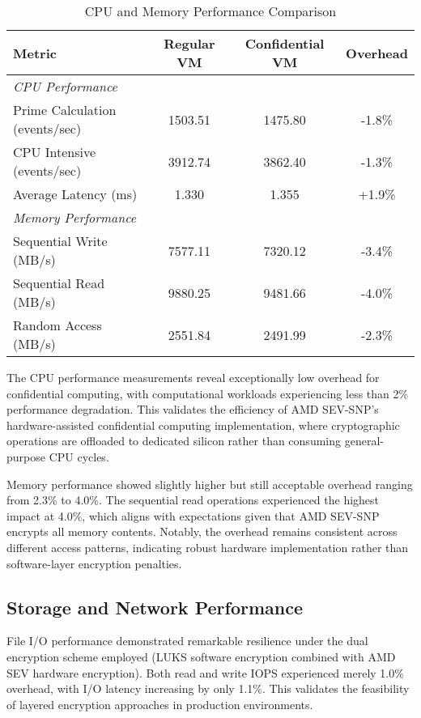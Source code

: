 \begin{table}[htbp]
\centering
\caption{CPU and Memory Performance Comparison}
\label{tab:cpu_memory_performance}
\begin{tabular}{lccc}
\toprule
\textbf{Metric} & \textbf{Regular VM} & \textbf{Confidential VM} & \textbf{Overhead} \\
\midrule
\multicolumn{4}{l}{\textit{CPU Performance}} \\
Prime Calculation (events/sec) & 1503.51 & 1475.80 & -1.8\% \\
CPU Intensive (events/sec) & 3912.74 & 3862.40 & -1.3\% \\
Average Latency (ms) & 1.330 & 1.355 & +1.9\% \\
\midrule
\multicolumn{4}{l}{\textit{Memory Performance}} \\
Sequential Write (MB/s) & 7577.11 & 7320.12 & -3.4\% \\
Sequential Read (MB/s) & 9880.25 & 9481.66 & -4.0\% \\
Random Access (MB/s) & 2551.84 & 2491.99 & -2.3\% \\
\bottomrule
\end{tabular}
\end{table}

The CPU performance measurements reveal exceptionally low overhead for confidential computing, with computational workloads experiencing less than 2\% performance degradation. This validates the efficiency of AMD SEV-SNP's hardware-assisted confidential computing implementation, where cryptographic operations are offloaded to dedicated silicon rather than consuming general-purpose CPU cycles.

Memory performance showed slightly higher but still acceptable overhead ranging from 2.3\% to 4.0\%. The sequential read operations experienced the highest impact at 4.0\%, which aligns with expectations given that AMD SEV-SNP encrypts all memory contents. Notably, the overhead remains consistent across different access patterns, indicating robust hardware implementation rather than software-layer encryption penalties.

\subsection{Storage and Network Performance}

File I/O performance demonstrated remarkable resilience under the dual encryption scheme employed (LUKS software encryption combined with AMD SEV hardware encryption). Both read and write IOPS experienced merely 1.0\% overhead, with I/O latency increasing by only 1.1\%. This validates the feasibility of layered encryption approaches in production environments.

